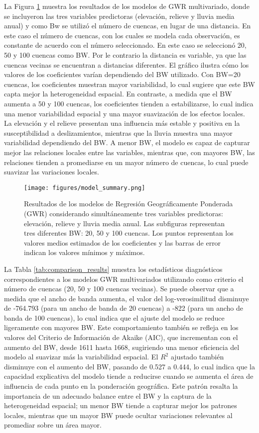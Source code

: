\documentclass[
  manuscript=article,  
  layout=preprint,  
]{format}
\begin{document}
La Figura \ref{fig:modelo_summary} muestra los resultados de los modelos de GWR multivariado, donde se incluyeron las tres variables predictoras (elevación, relieve y lluvia media anual) y como Bw se utilizó el número de cuencas, en lugar de una distancia. En este caso el número de cuencas, con los cuales se modela cada observación, es constante de acuerdo con el número seleccionado. En este caso se seleccionó 20, 50 y 100 cuencas como BW. Por le contrario la distancia es variable, ya que las cuencas vecinas se encuentran a distancias diferentes. El gráfico ilustra cómo los valores de los coeficientes varían dependiendo del BW utilizado. Con BW=20 cuencas, los coeficientes muestran mayor variabilidad, lo cual sugiere que este BW capta mejor la heterogeneidad espacial. En contraste, a medida que el BW aumenta a 50 y 100 cuencas, los coeficientes tienden a estabilizarse, lo cual indica una menor variabilidad espacial y una mayor suavización de los efectos locales. La elevación y el relieve presentan una influencia más estable y positiva en la susceptibilidad a deslizamientos, mientras que la lluvia muestra una mayor variabilidad dependiendo del BW. A menor BW, el modelo es capaz de capturar mejor las relaciones locales entre las variables, mientras que, con mayores BW, las relaciones tienden a promediarse en un mayor número de cuencas, lo cual puede suavizar las variaciones locales.
  
\begin{figure}[ht!]
    \centering
      {\texttt{[image: figures/model\_summary.png]}}
\caption{Resultados de los modelos de Regresión Geográficamente Ponderada (GWR) considerando simultáneamente tres variables predictoras: elevación, relieve y lluvia media anual. Las subfiguras representan tres diferentes BW: 20, 50 y 100 cuencas. Los puntos representan los valores medios estimados de los coeficientes y las barras de error indican los valores mínimos y máximos.}
    \label{fig:modelo_summary}
\end{figure}

La Tabla \ref{tab:comparison_results} muestra los estadísticos diagnósticos correspondientes a los modelos GWR multivariados utilizando como criterio el número de cuencas (20, 50 y 100 cuencas vecinas). Se puede observar que a medida que el ancho de banda aumenta, el valor del log-verosimilitud disminuye de -764.793 (para un ancho de banda de 20 cuencas) a -822 (para un ancho de banda de 100 cuencas), lo cual indica que el ajuste del modelo se reduce ligeramente con mayores BW. Este comportamiento también se refleja en los valores del Criterio de Información de Akaike (AIC), que incrementan con el aumento del BW, desde 1611 hasta 1668, sugiriendo una menor eficiencia del modelo al suavizar más la variabilidad espacial. El $R^2$ ajustado también disminuye con el aumento del BW, pasando de 0.527 a 0.444, lo cual indica que la capacidad explicativa del modelo tiende a reducirse cuando se aumenta el área de influencia de cada punto en la ponderación geográfica. Este patrón resalta la importancia de un adecuado balance entre el BW y la captura de la heterogeneidad espacial; un menor BW tiende a capturar mejor los patrones locales, mientras que un mayor BW puede ocultar variaciones relevantes al promediar sobre un área mayor.
\end{document}
